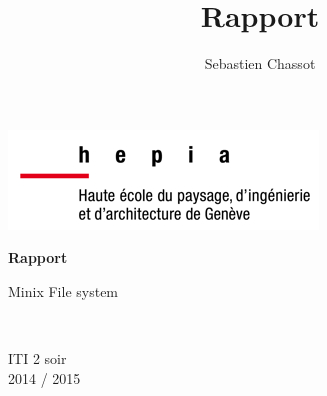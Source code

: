 \documentclass[a4paper,12pt]{article}
\begin{document}
\pagestyle{fancy}
\lhead{}
\chead{}
\rhead{}
\lfoot{}
\rfoot{}
\renewcommand{\headrulewidth}{0.1pt}
\renewcommand{\footrulewidth}{0.1pt}

\fancyfoot[L]{\scriptsize\emph{\docschool{}}}



\author{Sebastien Chassot}
\newcommand{\docschool}{hepia - ITI}
\title{Rapport}

\begin{center}
\includegraphics[scale=2]{imgs/hepia}
\end{center}

\vspace{3cm}

\begin{center}
\begin{huge}
\textbf{Rapport}
\end{huge}
\end{center}

\begin{center}
\begin{large}
Minix File system
\end{large}
\end{center}

\newcommand{\lineunder}{\color{bleuClair}\hrulefill\\\color{black}}
\lineunder

\begin{center}
\begin{large}
ITI 2 soir \\
2014 / 2015
\end{large}
\end{center}
\end{document}
